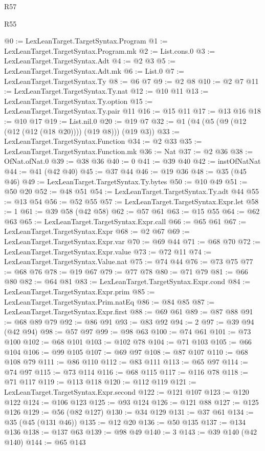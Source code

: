 \begin{lexlean}{R57}
\begin{lexlean}{R55}
\begin{coremodule}
{{{{{{{{{{{{{{{{{{{{{{{{{{{{{{{{{{{{{{{{{{{{{{{{{{{{{{{{{{{{@0 := LexLeanTarget.TargetSyntax.Program
@1 := LexLeanTarget.TargetSyntax.Program.mk
@2 := List.cons.{0}
@3 := LexLeanTarget.TargetSyntax.Adt
@4 := @2 @3
@5 := LexLeanTarget.TargetSyntax.Adt.mk
@6 := List.{0}
@7 := LexLeanTarget.TargetSyntax.Ty
@8 := @6 @7
@9 := @2 @8
@10 := @2 @7
@11 := LexLeanTarget.TargetSyntax.Ty.nat
@12 := @10 @11
@13 := LexLeanTarget.TargetSyntax.Ty.option
@15 := LexLeanTarget.TargetSyntax.Ty.pair @11
@16 := @15 @11
@17 := @13 @16
@18 := @10 @17
@19 := List.nil.{0}
@20 := @19 @7
@32 := @1 (@4 (@5 (@9 (@12 (@12 (@12 (@18 @20)))) (@19 @8))) (@19 @3))
@33 := LexLeanTarget.TargetSyntax.Function
@34 := @2 @33
@35 := LexLeanTarget.TargetSyntax.Function.mk
@36 := Nat
@37 := @2 @36
@38 := OfNat.ofNat.{0}
@39 := @38 @36
@40 := 0
@41 := @39 @40
@42 := instOfNatNat
@44 := @41 (@42 @40)
@45 := @37 @44
@46 := @19 @36
@48 := @35 (@45 @46)
@49 := LexLeanTarget.TargetSyntax.Ty.bytes
@50 := @10 @49
@51 := @50 @20
@52 := @48 @51
@54 := LexLeanTarget.TargetSyntax.Ty.adt @44
@55 := @13 @54
@56 := @52 @55
@57 := LexLeanTarget.TargetSyntax.Expr.let
@58 := 1
@61 := @39 @58 (@42 @58)
@62 := @57 @61
@63 := @15 @55
@64 := @62 @63
@65 := LexLeanTarget.TargetSyntax.Expr.call
@66 := @65 @61
@67 := LexLeanTarget.TargetSyntax.Expr
@68 := @2 @67
@69 := LexLeanTarget.TargetSyntax.Expr.var
@70 := @69 @44
@71 := @68 @70
@72 := LexLeanTarget.TargetSyntax.Expr.value
@73 := @72 @11
@74 := LexLeanTarget.TargetSyntax.Value.nat
@75 := @74 @44
@76 := @73 @75
@77 := @68 @76
@78 := @19 @67
@79 := @77 @78
@80 := @71 @79
@81 := @66 @80
@82 := @64 @81
@83 := LexLeanTarget.TargetSyntax.Expr.cond
@84 := LexLeanTarget.TargetSyntax.Expr.prim
@85 := LexLeanTarget.TargetSyntax.Prim.natEq
@86 := @84 @85
@87 := LexLeanTarget.TargetSyntax.Expr.first
@88 := @69 @61
@89 := @87 @88
@91 := @68 @89 @79
@92 := @86 @91
@93 := @83 @92
@94 := 2
@97 := @39 @94 (@42 @94)
@98 := @57 @97
@99 := @98 @63
@100 := @74 @61
@101 := @73 @100
@102 := @68 @101
@103 := @102 @78
@104 := @71 @103
@105 := @66 @104
@106 := @99 @105
@107 := @69 @97
@108 := @87 @107
@110 := @68 @108 @79
@111 := @86 @110
@112 := @83 @111
@113 := @65 @97
@114 := @74 @97
@115 := @73 @114
@116 := @68 @115
@117 := @116 @78
@118 := @71 @117
@119 := @113 @118
@120 := @112 @119
@121 := LexLeanTarget.TargetSyntax.Expr.second
@122 := @121 @107
@123 := @120 @122
@124 := @106 @123
@125 := @93 @124
@126 := @121 @88
@127 := @125 @126
@129 := @56 (@82 @127)
@130 := @34 @129
@131 := @37 @61
@134 := @35 (@45 (@131 @46))
@135 := @12 @20
@136 := @50 @135
@137 := @134 @136
@138 := @137 @63
@139 := @98 @49
@140 := 3
@143 := @39 @140 (@42 @140)
@144 := @65 @143
}}}}}}}}}}}}}}}}}}}}}}}}}}}}}}}}}}}}}}}}}}}}}}}}}}}}}}}}}}}}
\end{coremodule}
\end{lexlean}
\end{lexlean}
